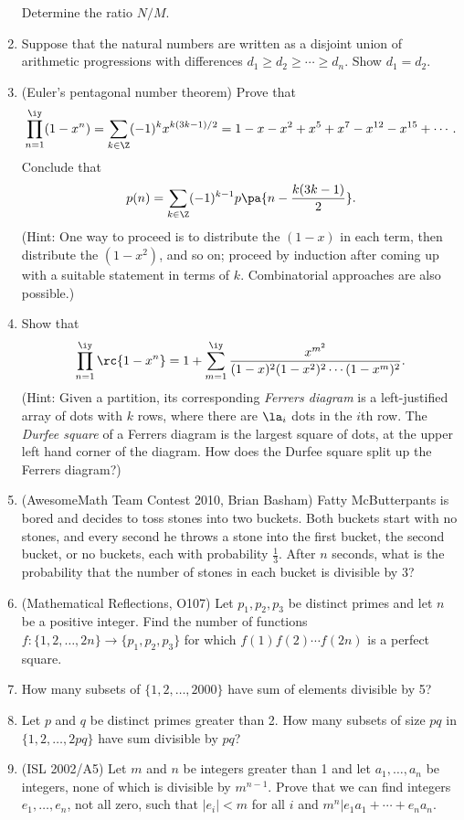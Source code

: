\begin{enumerate}
Determine the ratio $N/M$.
\item Suppose that the natural numbers are written as a disjoint union of arithmetic progressions with differences $d_1\ge d_2\ge\cdots \ge d_n$. Show $d_1=d_2$.
\item (Euler's pentagonal number theorem) Prove that
\[
\prod_{n=1}^{\iy}(1-x^n)=\sum_{k\in\Z} (-1)^k x^{k(3k-1)/2}=1-x-x^2+x^5+x^7-x^{12}-x^{15}+\cdots.
\]
Conclude that
\[
p(n)=\sum_{k\in  \Z}(-1)^{k-1}p\pa{n-\frac{k(3k-1)}{2}}.
\]
(Hint: One way to proceed is to distribute the $(1-x)$ in each term, then distribute the $(1-x^2)$, and so on; proceed by induction after coming up with a suitable statement in terms of $k$. Combinatorial approaches are also possible.)
\item Show that 
\[
\prod_{n=1}^{\iy} \rc{1-x^n}=1+\sum_{m=1}^{\iy} \frac{x^{m^2}}{(1-x)^2(1-x^2)^2\cdots (1-x^m)^2}.
\]
(Hint: Given a partition, its corresponding {\it Ferrers diagram} is a left-justified array of dots with $k$ rows, where there are $\la_i$ dots in the $i$th row. The {\it Durfee square} of a Ferrers diagram is the largest square of dots, at the upper left hand corner of the diagram. How does the Durfee square split up the Ferrers diagram?)
\item (AwesomeMath Team Contest 2010, Brian Basham)
Fatty McButterpants is bored and decides to toss stones into two buckets. Both buckets start with no stones, and every second he throws a stone into the first bucket, the second bucket, or no buckets, each with probability $\frac{1}{3}$. After $n$ seconds, what is the probability that the number of stones in each bucket is divisible by $3$?
\item (Mathematical Reflections, O107) Let $p_1,p_2,p_3$ be distinct primes and let $n$ be a positive integer. Find the number of functions $f:\{1,2,\ldots, 2n\}\to \{p_1,p_2,p_3\}$ for which $f(1)f(2)\cdots f(2n)$ is a perfect square.
\item How many subsets of $\{1,2,\ldots, 2000\}$ have sum of elements divisible by 5?
\item Let $p$ and $q$ be distinct primes greater than 2. How many subsets of size $pq$ in $\{1,2,\ldots, 2pq\}$ have sum divisible by $pq$?
\item (ISL 2002/A5) Let $m$ and $n$ be integers greater than 1 and let $a_1,\ldots, a_n$ be integers, none of which is divisible by $m^{n-1}$. Prove that we can find integers $e_1,\ldots, e_n$, not all zero, such that $|e_i|<m$ for all $i$ and $m^n|e_1a_1+\cdots +e_na_n$.


\end{enumerate}
